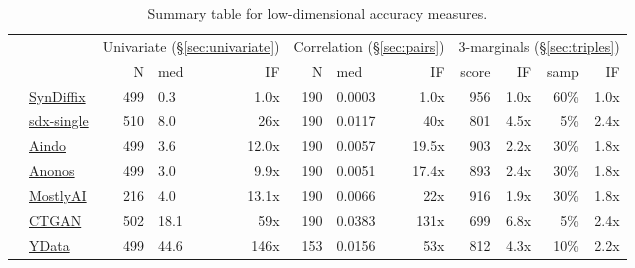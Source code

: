 \begin{table}
    \centering
    \caption{Summary table for low-dimensional accuracy measures.}
    \label{tab:accuracy}
    \small
    \begin{tabular}{llrlr@{\hskip 10pt}r@{\hskip 6pt}l@{\hskip 6pt}r@{\hskip 10pt}r@{\hskip 6pt}r@{\hskip 6pt}r@{\hskip 6pt}r}
        \toprule
          &   & \multicolumn{3}{c}{Univariate (\S\ref{sec:univariate})} & \multicolumn{3}{c}{Correlation (\S\ref{sec:pairs})} & \multicolumn{4}{c}{3-marginals (\S\ref{sec:triples})} \\
        
 & & N & med & IF & N & med & IF & score & IF & samp & IF \\
\midrule
        \cellcolor{blue} & \href{https://htmlpreview.github.io/?https://github.com/yoid2000/sdnist-summary/blob/main/results/syndiffix_all/report.html}{SynDiffix} & 499 & 0.3 & 1.0x & 190 & 0.0003 & 1.0x & 956 & 1.0x & 60\% & 1.0x \\
        \cellcolor{blue} & \href{https://htmlpreview.github.io/?https://github.com/yoid2000/sdnist-summary/blob/main/results/sdx_single/report.html}{sdx-single} & 510 & 8.0 & 26x & 190 & 0.0117 & 40x & 801 & 4.5x & 5\% & 2.4x \\
        \cellcolor{red} & \href{https://htmlpreview.github.io/?https://github.com/yoid2000/sdnist-summary/blob/main/results/aindo_synth/report.html}{Aindo} & 499 & 3.6 & 12.0x & 190 & 0.0057 & 19.5x & 903 & 2.2x & 30\% & 1.8x \\
        \cellcolor{red} & \href{https://htmlpreview.github.io/?https://github.com/yoid2000/sdnist-summary/blob/main/results/anonos_sdk/report.html}{Anonos} & 499 & 3.0 & 9.9x & 190 & 0.0051 & 17.4x & 893 & 2.4x & 30\% & 1.8x \\
        \cellcolor{red} & \href{https://htmlpreview.github.io/?https://github.com/yoid2000/sdnist-summary/blob/main/results/mostlyai_sd_platform/report.html}{MostlyAI} & 216 & 4.0 & 13.1x & 190 & 0.0066 & 22x & 916 & 1.9x & 30\% & 1.8x \\
        \cellcolor{red} & \href{https://htmlpreview.github.io/?https://github.com/yoid2000/sdnist-summary/blob/main/results/sdv_ctgan_epochs1000/report.html}{CTGAN} & 502 & 18.1 & 59x & 190 & 0.0383 & 131x & 699 & 6.8x & 5\% & 2.4x \\
        \cellcolor{pink} & \href{https://htmlpreview.github.io/?https://github.com/yoid2000/sdnist-summary/blob/main/results/ydata_fabric_synthesizers/report.html}{YData} & 499 & 44.6 & 146x & 153 & 0.0156 & 53x & 812 & 4.3x & 10\% & 2.2x \\

\end{tabular}
\end{table}
